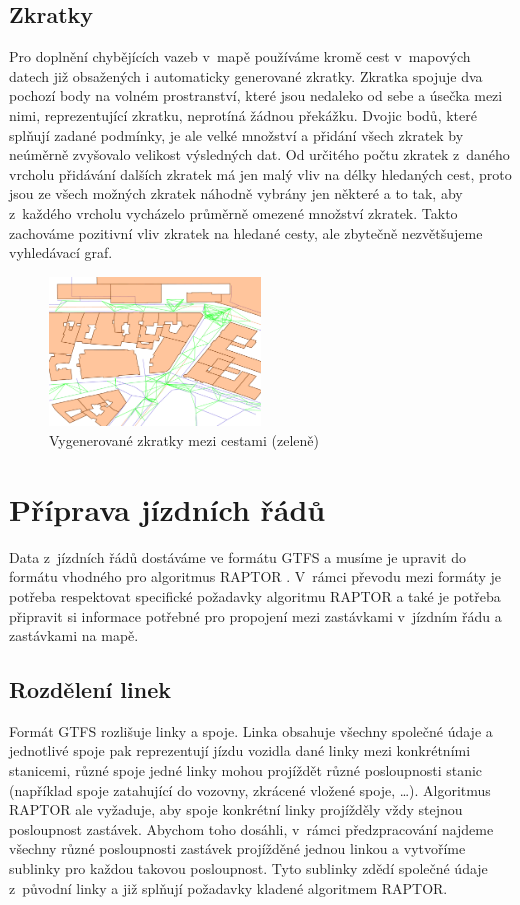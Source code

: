 \subsection{Zkratky}
Pro doplnění chybějících vazeb v~mapě používáme kromě cest v~mapových datech
již obsažených i automaticky generované zkratky. Zkratka spojuje dva pochozí
body na volném prostranství, které jsou nedaleko od sebe a úsečka mezi nimi,
reprezentující zkratku, neprotíná žádnou překážku. Dvojic bodů, které splňují
zadané podmínky, je ale velké množství a přidání všech zkratek by neúměrně
zvyšovalo velikost výsledných dat. Od určitého počtu zkratek z~daného vrcholu přidávání
dalších zkratek má jen malý vliv na délky hledaných cest, proto jsou ze všech
možných zkratek náhodně vybrány jen některé a to tak, aby z~každého vrcholu
vycházelo průměrně omezené množství zkratek. Takto zachováme pozitivní vliv
zkratek na hledané cesty, ale zbytečně nezvětšujeme vyhledávací graf.
\begin{figure}
  \centering
    \includegraphics[width=0.5\textwidth]{../img/zkratky.pdf}
  \caption{Vygenerované zkratky mezi cestami (zeleně)}
  \label{fig:zkratky}
\end{figure}

\section{Příprava jízdních řádů}
Data z~jízdních řádů dostáváme ve formátu GTFS \cite{GTFS} a musíme je
upravit do formátu vhodného pro algoritmus RAPTOR \cite{RAPTOR}. V~rámci převodu
mezi formáty je potřeba respektovat specifické požadavky algoritmu RAPTOR a také
je potřeba připravit si informace potřebné pro propojení mezi zastávkami
v~jízdním řádu a zastávkami na mapě.

\subsection{Rozdělení linek}
Formát GTFS rozlišuje linky a spoje. Linka obsahuje všechny společné údaje a
jednotlivé spoje pak reprezentují jízdu vozidla dané linky mezi konkrétními
stanicemi, různé spoje jedné linky mohou projíždět různé posloupnosti stanic
(například spoje zatahující do vozovny, zkrácené vložené spoje, \dots).
Algoritmus RAPTOR ale vyžaduje, aby spoje konkrétní linky projížděly vždy
stejnou posloupnost zastávek. Abychom toho dosáhli, v~rámci předzpracování
najdeme všechny různé posloupnosti zastávek projížděné jednou linkou a vytvoříme
sublinky pro každou takovou posloupnost. Tyto sublinky zdědí společné údaje
z~původní linky a již splňují požadavky kladené algoritmem RAPTOR. 

